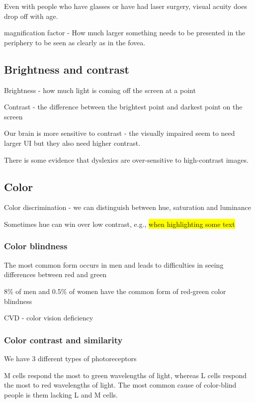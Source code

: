 \documentclass[]{project_plan}
\begin{document}
Even with people who have glasses or have had laser surgery, visual acuity
does drop off with age.

magnification factor - How much larger something needs to be presented in the periphery to be seen as clearly as in the fovea.

\subsection{Brightness and contrast}
Brightness - how much light is coming off the screen at a point

Contrast - the difference between the brightest point and darkest point
on the screen

Our brain is more sensitive to contrast - the visually impaired seem to
need larger UI but they also need higher contrast.

There is some evidence that dyslexics are over-sensitive to high-contrast images.

\newpage

\subsection{Color}

Color discrimination - we can distinguish between hue, saturation and luminance

Sometimes hue can win over low contrast, e.g., \colorbox{yellow}{when highlighting some text}

\subsubsection{Color blindness}

The most common form occurs in men and leads to difficulties in seeing differences
between red and green

8\% of men and 0.5\% of women have  the common form of red-green color blindness

CVD - color vision deficiency

\subsubsection{Color contrast and similarity}
We have 3 different types of photoreceptors

M cells respond the most to green wavelengths of light, whereas L cells respond
the most to red wavelengths of light. The most common cause of color-blind people
is them lacking L and M cells.
\end{document}
